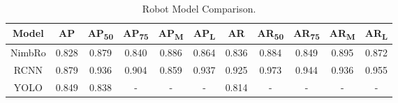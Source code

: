 \begin{table}[h!]
\caption{Robot Model Comparison.}
\centering
    \begin{tabular}{|c|c|c|c|c|c|c|c|c|c|c|} 
    \hline
    \rowcolor{lightgray} \textbf{Model} & \textbf{AP} & \textbf{AP\textsubscript{50}} & \textbf{AP\textsubscript{75}} & \textbf{AP\textsubscript{M}} & \textbf{AP\textsubscript{L}} & \textbf{AR} & \textbf{AR\textsubscript{50}} & \textbf{AR\textsubscript{75}} & \textbf{AR\textsubscript{M}} & \textbf{AR\textsubscript{L}} \\ 
    \hline
    NimbRo         & 0.828       & 0.879                         & 0.840                         & 0.886                        & 0.864                        & 0.836       & 0.884                         & 0.849                         & 0.895                        & 0.872 \\
    \hline
    RCNN           & 0.879       & 0.936                         & 0.904                         & 0.859                        & 0.937                        & 0.925       & 0.973                         & 0.944                         & 0.936                        & 0.955 \\
    \hline
    YOLO           & 0.849       & 0.838                         & -                             & -                            & -                            & 0.814       & -                             & -                             & -                            & - \\
    \hline
    \end{tabular}
    \label{tb:robotmodelcomparison}\\
\end{table}

